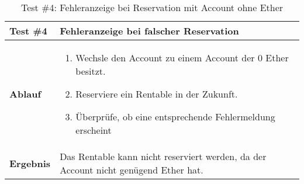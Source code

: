 \begin{table}[H]
\centering
\caption{Test \#4: Fehleranzeige bei Reservation mit Account ohne Ether}
\label{my-label}
\begin{tabular}{@{}L{1.6cm}L{11cm}@{}}
\toprule
\textbf{Test \#4}
& Fehleranzeige bei falscher Reservation
\\ \midrule
\textbf{Ablauf}
& 
\begin{enumerate}
    \item Wechsle den Account zu einem Account der 0 Ether besitzt.
    \item Reserviere ein Rentable in der Zukunft.
    \item Überprüfe, ob eine entsprechende Fehlermeldung erscheint
\end{enumerate}
\\ \midrule
\textbf{Ergebnis}
& Das Rentable kann nicht reserviert werden, da der Account nicht genügend Ether hat.
\\ \bottomrule
\end{tabular}
\end{table}